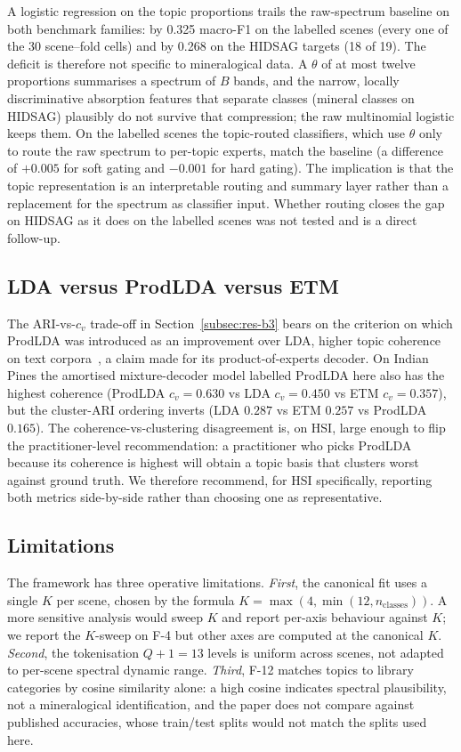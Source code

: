 \documentclass[journal,a4paper,10pt]{IEEEtran}
\begin{document}
A logistic regression on the topic proportions trails the raw-spectrum
baseline on both benchmark families: by 0.325 macro-F1 on the labelled
scenes (every one of the 30 scene--fold cells) and by 0.268 on the
HIDSAG targets (18 of 19). The deficit is therefore not specific to
mineralogical data. A $\theta$ of at most twelve proportions summarises
a spectrum of $B$ bands, and the narrow, locally discriminative
absorption features that separate classes (mineral classes on HIDSAG)
plausibly do not survive that compression; the raw multinomial
logistic keeps them. On the labelled
scenes the topic-routed classifiers, which use $\theta$ only to route
the raw spectrum to per-topic experts, match the baseline (a
difference of $+0.005$ for soft gating and $-0.001$ for hard gating).
The implication is that the topic representation is an interpretable
routing and summary layer rather than a replacement for the spectrum
as classifier input. Whether routing closes the gap on HIDSAG as it
does on the labelled scenes was not tested and is a direct follow-up.

\subsection{LDA versus ProdLDA versus ETM}

The ARI-vs-$c_v$ trade-off in Section~\ref{subsec:res-b3} bears on the
criterion on which ProdLDA was introduced as an improvement over LDA,
higher topic coherence on text corpora~\cite{srivastava2017autoencoding},
a claim made for its product-of-experts decoder. On Indian Pines the
amortised mixture-decoder model labelled ProdLDA here also has the
highest coherence (ProdLDA $c_v = 0.630$ vs LDA $c_v = 0.450$ vs ETM
$c_v = 0.357$), but the cluster-ARI ordering inverts (LDA $0.287$ vs
ETM $0.257$ vs ProdLDA $0.165$). The coherence-vs-clustering
disagreement is, on HSI, large enough to flip the practitioner-level
recommendation: a practitioner who picks ProdLDA because its
coherence is highest will obtain a topic basis that clusters worst
against ground truth. We therefore recommend, for HSI specifically,
reporting both metrics side-by-side rather than choosing one as
representative.

\subsection{Limitations}

The framework has three operative limitations. \emph{First}, the
canonical fit uses a single $K$ per scene, chosen by the formula
$K = \max(4, \min(12, n_{\text{classes}}))$. A more sensitive analysis
would sweep $K$ and report per-axis behaviour against $K$; we report
the $K$-sweep on F-4 but other axes are computed at the canonical $K$.
\emph{Second}, the tokenisation $Q+1 = 13$ levels is uniform across
scenes, not adapted to per-scene spectral dynamic range. \emph{Third},
F-12 matches topics to library categories by cosine similarity alone:
a high cosine indicates spectral plausibility, not a mineralogical
identification, and the paper does not compare against published
accuracies, whose train/test splits would not match the splits used
here.
\end{document}
